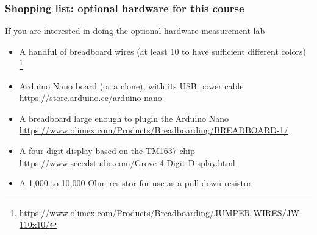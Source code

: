 \begin{frame}
\frametitle{Shopping list: optional hardware for this course}
  If you are interested in doing the optional hardware measurement lab
    \begin{itemize}
      \item A handful of breadboard wires (at least 10 to have sufficient different colors)
	    \footnote{\tiny \url{https://www.olimex.com/Products/Breadboarding/JUMPER-WIRES/JW-110x10/}}
      \item Arduino Nano board (or a clone), with its USB power cable\\
            \url{https://store.arduino.cc/arduino-nano}
      \item A breadboard large enough to plugin the Arduino Nano\\
            \url{https://www.olimex.com/Products/Breadboarding/BREADBOARD-1/}
      \item A four digit display based on the TM1637 chip\\
            \url{https://www.seeedstudio.com/Grove-4-Digit-Display.html}
      \item A 1,000 to 10,000 Ohm resistor for use as a pull-down resistor
    \end{itemize}
\end{frame}
